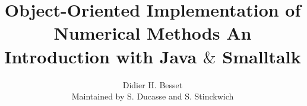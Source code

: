 \documentclass[twoside]{book}
\begin{document}
\title{\textbf{Object-Oriented Implementation of \linebreak Numerical Methods\linebreak
 An Introduction with Java $\&$ Smalltalk}}
\author{Didier H. Besset\\ Maintained by S. Ducasse and S. Stinckwich}
\maketitle {}

\makeatletter
\def\url@leostyle{%
  \@ifundefined{selectfont}{\def\UrlFont{\sf}}{\def\UrlFont{\sffamily}}}
\makeatother

~ %
\vfill
\end{document}

